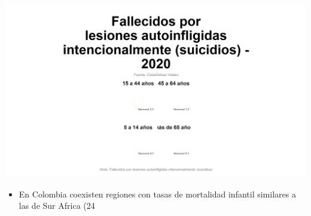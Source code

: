 \documentclass[aspectratio=169]{beamer}
\begin{document}
    \begin{slide}{13} 
                      \begin{imagecolumn}
                \includegraphics[width=\columnwidth]{img/var_325_static.png}
            \end{imagecolumn}
            \begin{textcolumn}
                \begin{itemize}
                    \item En Colombia coexisten regiones con tasas de mortalidad infantil similares a las de Sur Africa (24%
                \end{itemize}
            \end{textcolumn}

    \printcolumns
    \end{slide}
    
\end{document}
